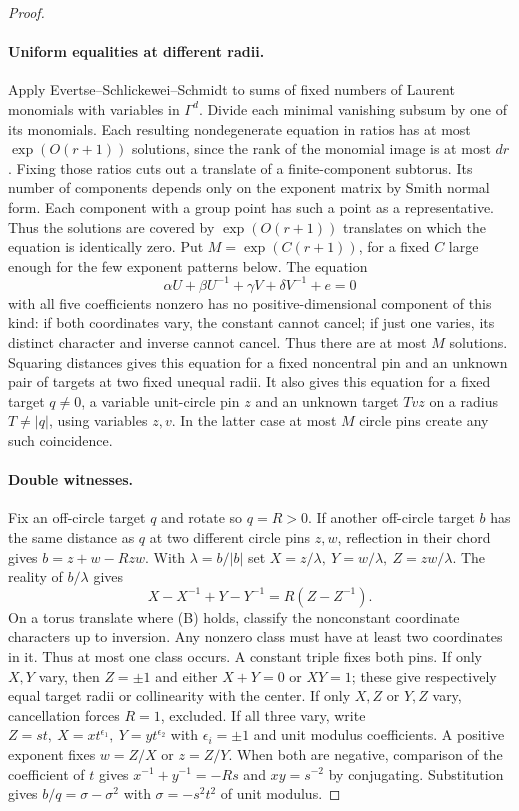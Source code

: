 \begin{proof}
\paragraph{Uniform equalities at different radii.}
Apply Evertse--Schlickewei--Schmidt \cite{ess} to sums of fixed numbers of Laurent monomials with variables in \(\Gamma^d\). Divide each minimal vanishing subsum by one of its monomials. Each resulting nondegenerate equation in ratios has at most \(\exp(O(r+1))\) solutions, since the rank of the monomial image is at most \(dr\). Fixing those ratios cuts out a translate of a finite-component subtorus. Its number of components depends only on the exponent matrix by Smith normal form. Each component with a group point has such a point as a representative. Thus the solutions are covered by \(\exp(O(r+1))\) translates on which the equation is identically zero.
Put \(M=\exp(C(r+1))\), for a fixed \(C\) large enough for the few exponent patterns below. The equation
\[
 \alpha U+\beta U^{-1}+\gamma V+\delta V^{-1}+e=0
\]
with all five coefficients nonzero has no positive-dimensional component of this kind: if both coordinates vary, the constant cannot cancel; if just one varies, its distinct character and inverse cannot cancel. Thus there are at most \(M\) solutions. Squaring distances gives this equation for a fixed noncentral pin and an unknown pair of targets at two fixed unequal radii. It also gives this equation for a fixed target \(q\ne0\), a variable unit-circle pin \(z\) and an unknown target \(Tvz\) on a radius \(T\ne|q|\), using variables \(z,v\). In the latter case at most \(M\) circle pins create any such coincidence.

\paragraph{Double witnesses.}
Fix an off-circle target \(q\) and rotate so \(q=R>0\). If another off-circle target \(b\) has the same distance as \(q\) at two different circle pins \(z,w\), reflection in their chord gives \(b=z+w-Rzw\). With \(\lambda=b/|b|\) set \(X=z/\lambda,\ Y=w/\lambda,\ Z=zw/\lambda\). The reality of \(b/\lambda\) gives
\[
 X-X^{-1}+Y-Y^{-1}=R(Z-Z^{-1}). \tag{B}
\]
On a torus translate where (B) holds, classify the nonconstant coordinate characters up to inversion. Any nonzero class must have at least two coordinates in it. Thus at most one class occurs. A constant triple fixes both pins. If only \(X,Y\) vary, then \(Z=\pm1\) and either \(X+Y=0\) or \(XY=1\); these give respectively equal target radii or collinearity with the center. If only \(X,Z\) or \(Y,Z\) vary, cancellation forces \(R=1\), excluded. If all three vary, write \(Z=st,\ X=xt^{\epsilon_1},\ Y=yt^{\epsilon_2}\) with \(\epsilon_i=\pm1\) and unit modulus coefficients. A positive exponent fixes \(w=Z/X\) or \(z=Z/Y\). When both are negative, comparison of the coefficient of \(t\) gives \(x^{-1}+y^{-1}=-Rs\) and \(xy=s^{-2}\) by conjugating. Substitution gives \(b/q=\sigma-\sigma^2\) with \(\sigma=-s^2t^2\) of unit modulus.


\end{proof}
